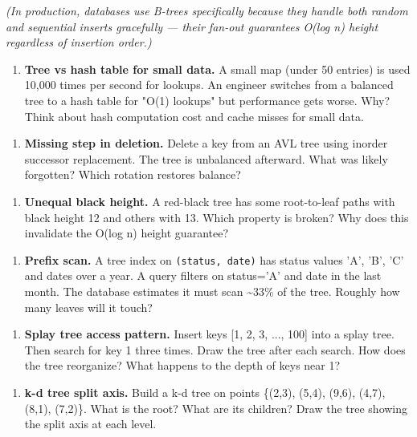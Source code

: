    \textit{(In production, databases use B-trees specifically because they handle both random and sequential inserts gracefully — their fan-out guarantees O(log n) height regardless of insertion order.)}

\begin{enumerate}
\item \textbf{Tree vs hash table for small data.} A small map (under 50 entries) is used 10,000 times per second for lookups. An engineer switches from a balanced tree to a hash table for "O(1) lookups" but performance gets worse. Why? Think about hash computation cost and cache misses for small data.
\end{enumerate}

\begin{enumerate}
\item \textbf{Missing step in deletion.} Delete a key from an AVL tree using inorder successor replacement. The tree is unbalanced afterward. What was likely forgotten? Which rotation restores balance?
\end{enumerate}

\begin{enumerate}
\item \textbf{Unequal black height.} A red-black tree has some root-to-leaf paths with black height 12 and others with 13. Which property is broken? Why does this invalidate the O(log n) height guarantee?
\end{enumerate}

\begin{enumerate}
\item \textbf{Prefix scan.} A tree index on \texttt{(status, date)} has status values 'A', 'B', 'C' and dates over a year. A query filters on status='A' and date in the last month. The database estimates it must scan \textasciitilde{}33\% of the tree. Roughly how many leaves will it touch?
\end{enumerate}

\begin{enumerate}
\item \textbf{Splay tree access pattern.} Insert keys [1, 2, 3, ..., 100] into a splay tree. Then search for key 1 three times. Draw the tree after each search. How does the tree reorganize? What happens to the depth of keys near 1?
\end{enumerate}

\begin{enumerate}
\item \textbf{k-d tree split axis.} Build a k-d tree on points \{(2,3), (5,4), (9,6), (4,7), (8,1), (7,2)\}. What is the root? What are its children? Draw the tree showing the split axis at each level.
\end{enumerate}


